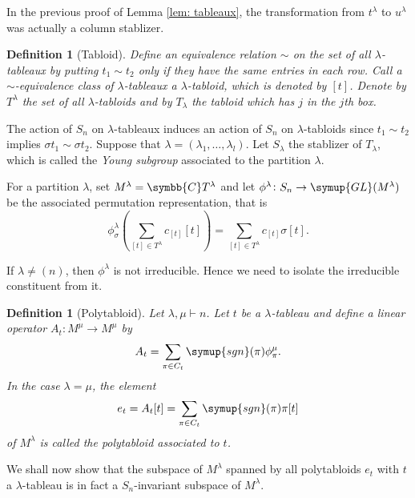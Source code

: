 \documentclass{assignment}[2019/10/15]
\newcommand{\lr}[3]{\left#1#3\right#2}
\theoremstyle{plain}
\newtheorem{definition}[theorem]{Definition}
\newcommand{\BC}{\symbb{C}}
\newcommand{\GL}{\mathop{}\!\symup{GL}}
\newcommand{\sgn}{\mathop{}\!\symup{sgn}}
\numberwithin{equation}{section}
\begin{document}
    In the previous proof of Lemma \ref{lem: tableaux}, the transformation from $t^\lambda$ to $u^\lambda$ was actually a column stablizer.

    \begin{definition}[Tabloid]
        Define an equivalence relation $\sim$ on the set of all $\lambda$-tableaux by putting $t_1\sim t_2$ only if they have the same entries in each row. Call a $\sim$-equivalence class of $\lambda$-tableaux a $\lambda$-\emph{tabloid}, which is denoted by $[t]$. Denote by $T^\lambda$ the set of all $\lambda$-tabloids and by $T_\lambda$ the tabloid which has $j$ in the $j$th box.
    \end{definition}

    The action of $S_n$ on $\lambda$-tableaux induces an action of $S_n$ on $\lambda$-tabloids since $t_1\sim t_2$ implies $\sigma t_1\sim \sigma t_2$. Suppose that $\lambda = (\lambda_1, \dotsc, \lambda_l)$. Let $S_\lambda$ the stablizer of $T_\lambda$, which is called the \emph{Young subgroup} associated to the partition $\lambda$.

    For a partition $\lambda$, set $M^\lambda = \BC T^\lambda$ and let $\phi^\lambda\colon S_n\to \GL(M^\lambda)$ be the associated permutation representation, that is
    \begin{equation}
        \phi_\sigma^\lambda\lr(){\sum_{[t]\in T^\lambda}c_{[t]}[t]} = \sum_{[t]\in T^\lambda}c_{[t]}\sigma[t].
    \end{equation}

    If $\lambda\neq (n)$, then $\phi^\lambda$ is not irreducible. Hence we need to isolate the irreducible constituent from it.

    \begin{definition}[Polytabloid]
        Let $\lambda, \mu\vdash n$. Let $t$ be a $\lambda$-tableau and define a linear operator $A_t\colon M^\mu\to M^\mu$ by
        \begin{equation}
            A_t = \sum_{\pi\in C_t}\sgn(\pi)\phi^\mu_\pi.
        \end{equation}
        In the case $\lambda=\mu$, the element
        \begin{equation}
            e_t = A_t[t] = \sum_{\pi\in C_t}\sgn(\pi)\pi[t]
        \end{equation}
        of $M^\lambda$ is called the polytabloid associated to $t$.
    \end{definition}

    We shall now show that the subspace of $M^\lambda$ spanned by all polytabloids $e_t$ with $t$ a $\lambda$-tableau is in fact a $S_n$-invariant subspace of $M^\lambda$.
\end{document}
